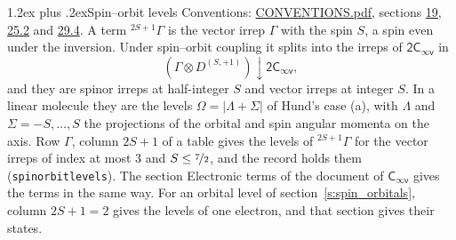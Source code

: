 \documentclass[10pt,a4paper]{article}
\makeatletter
\renewcommand\section{\@startsection{section}{1}{\z@}{-3ex plus -1ex minus -.2ex}%
  {1.2ex plus .2ex}{\normalfont\large\sffamily\bfseries\color{parttitle}}}
\numberwithin{equation}{section}
\newcommand{\grp}[1]{\mathsf{#1}}
\newcommand{\restr}[2]{#1\!\downarrow#2}
\newcommand{\irrJp}[2]{D^{(#1,#2)}}
\newcommand{\irrprod}{\otimes}
\newcommand{\term}[2]{{}^{#1}#2}
\makeatother
\begin{document}
\section{Spin--orbit levels}\label{s:spin_orbit}
Conventions: \href{../../CONVENTIONS.pdf}{CONVENTIONS.pdf}, sections \href{../../../rotation/CONVENTIONS.pdf\#conv.19}{19}, \href{../../CONVENTIONS.pdf\#conv.25.2}{25.2} and \href{../../CONVENTIONS.pdf\#conv.29.4}{29.4}.
\leavevmode\label{n:local.spin}\label{n:symbol.term}A term $\term{2S+1}{\Gamma}$ is the vector irrep $\Gamma$ with the spin $S$, a spin even under the inversion. Under spin--orbit coupling it splits into the irreps of $\grp{2C_{\infty v}}$ in
\begin{equation}\label{e:spinorbit}\restr{(\Gamma \irrprod \irrJp{S}{+1})}{\grp{2C_{\infty v}}},\end{equation}
and they are spinor irreps at half-integer $S$ and vector irreps at integer $S$. In a linear molecule they are the levels $\Omega = \lvert\Lambda + \Sigma\rvert$ of Hund's case (a), with $\Lambda$ and $\Sigma = -S, \dots, S$ the projections of the orbital and spin angular momenta on the axis. Row $\Gamma$, column $2S + 1$ of a table gives the levels of $\term{2S+1}{\Gamma}$ for the vector irreps of index at most 3 and $S \le \nicefrac{7}{2}$, and the record holds them (\texttt{spinorbitlevels}). The section Electronic terms of the document of \href{../../../rotation/data/pdf/Cinfv.pdf}{$\grp{C_{\infty v}}$} gives the terms in the same way. For an orbital level of section~\ref{s:spin_orbitals}, column $2S + 1 = 2$ gives the levels of one electron, and that section gives their states.
\end{document}
